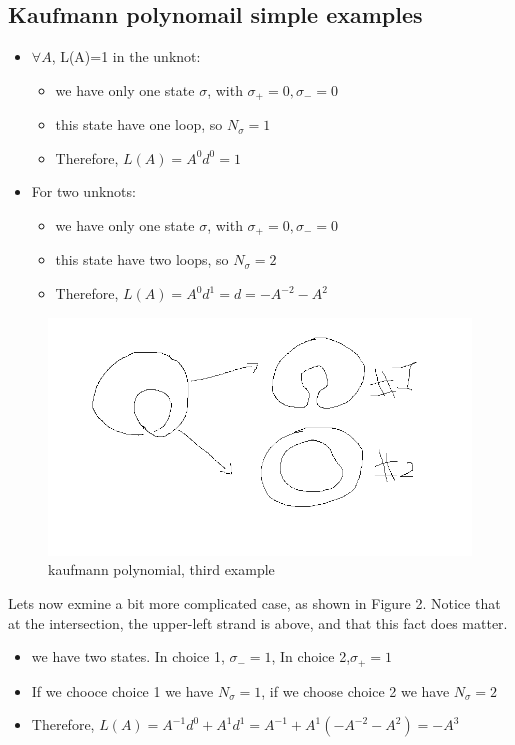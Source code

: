 \documentclass{article}
\begin{document}
\subsection{Kaufmann polynomail simple examples}
\begin{itemize}
\item \(\forall A\), L(A)=1 in the unknot:
    \begin{itemize}
    \item we have only one state $\sigma$, with \(\sigma_{+}=0,\sigma_{-}=0\)
    \item this state have one loop, so \(N_{\sigma} = 1\)
    \item Therefore, $L(A) = A^{0}d^{0}=1$
    \end{itemize}
\item For two unknots:
    \begin{itemize}
    \item we have only one state $\sigma$, with \(\sigma_{+}=0,\sigma_{-}=0\)
    \item this state have two loops, so \(N_{\sigma} = 2\)
    \item Therefore, $L(A) = A^{0}d^{1}=d=-A^{-2}-A^{2}$
    \end{itemize}
\end{itemize}

\begin{figure}
\includegraphics[scale=0.17]{kauffman_calc}
\caption{kaufmann polynomial, third example}
\end{figure}

Lets now exmine a bit more complicated case, as shown in Figure 2. Notice that at the intersection, the upper-left strand is above, and that this fact does matter.
\begin{itemize}
    \item we have two states. In choice 1, $\sigma_{-}=1$, In choice 2,$\sigma_{+}=1$
    \item If we chooce choice 1 we have \(N_{\sigma} = 1\), if we choose choice 2 we have \(N_{\sigma} = 2\)
    \item Therefore, $L(A) = A^{-1}d^{0} + A^{1}d^{1} = A^{-1} +A^{1}(-A^{-2}-A^{2}) = -A^{3}$
\end{itemize}
\end{document}
